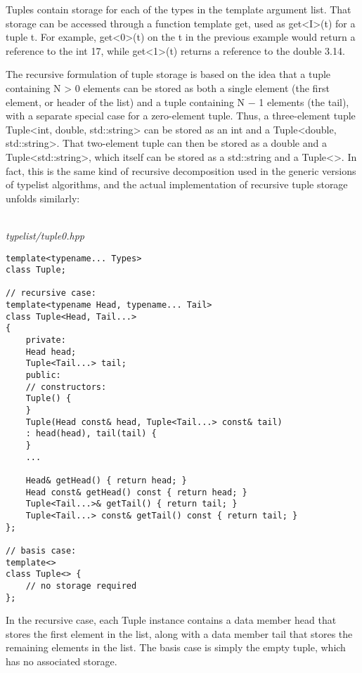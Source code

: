 



Tuples contain storage for each of the types in the template argument list. That storage can be accessed through a function template get, used as get<I>(t) for a tuple t. For example, get<0>(t) on the t in the previous example would return a reference to the int 17, while get<1>(t) returns a reference to the double 3.14.

The recursive formulation of tuple storage is based on the idea that a tuple containing N > 0 elements can be stored as both a single element (the first element, or header of the list) and a tuple containing N − 1 elements (the tail), with a separate special case for a zero-element tuple. Thus, a three-element tuple Tuple<int, double, std::string> can be stored as an int and a Tuple<double, std::string>. That two-element tuple can then be stored as a double and a Tuple<std::string>, which itself can be stored as a std::string and a Tuple<>. In fact, this is the same kind of recursive decomposition used in the generic versions of typelist algorithms, and the actual implementation of recursive tuple storage unfolds similarly:

\hspace*{\fill} \\ %
\noindent
\textit{typelist/tuple0.hpp}
\begin{lstlisting}[style=styleCXX]
template<typename... Types>
class Tuple;

// recursive case:
template<typename Head, typename... Tail>
class Tuple<Head, Tail...>
{
	private:
	Head head;
	Tuple<Tail...> tail;
	public:
	// constructors:
	Tuple() {
	}
	Tuple(Head const& head, Tuple<Tail...> const& tail)
	: head(head), tail(tail) {
	}
	...
	
	Head& getHead() { return head; }
	Head const& getHead() const { return head; }
	Tuple<Tail...>& getTail() { return tail; }
	Tuple<Tail...> const& getTail() const { return tail; }
};

// basis case:
template<>
class Tuple<> {
	// no storage required
};
\end{lstlisting}

In the recursive case, each Tuple instance contains a data member head that stores the first element in the list, along with a data member tail that stores the remaining elements in the list. The basis case is simply the empty tuple, which has no associated storage.

